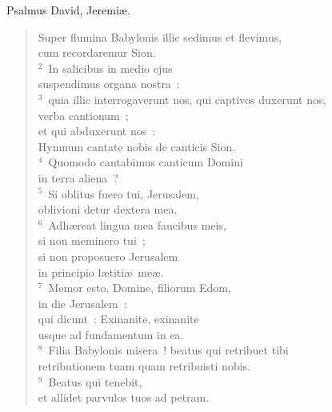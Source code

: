 \lettrine[lines=3,image=true,loversize=0.05,lraise=-0.03]{P}{}salmus David, Jeremi\ae . \begin{flushleft}\begin{verse}\vspace{6pt}Super flumina Babylonis illic sedimus et flevimus,\\ cum recordaremur Sion.\\
${}^{2}$~In salicibus in medio ejus\\ suspendimus organa nostra~:\\
${}^{3}$~quia illic interrogaverunt nos, qui captivos duxerunt nos,\\ verba cantionum~;\\ et qui abduxerunt nos~:\\ Hymnum cantate nobis de canticis Sion.\\
${}^{4}$~Quomodo cantabimus canticum Domini\\ in terra aliena~?\\
${}^{5}$~Si oblitus fuero tui, Jerusalem,\\ oblivioni detur dextera mea.\\
${}^{6}$~Adh\ae reat lingua mea faucibus meis,\\ si non meminero tui~;\\ si non proposuero Jerusalem\\ in principio l\ae titi\ae\ me\ae .\\
${}^{7}$~Memor esto, Domine, filiorum Edom,\\ in die Jerusalem~:\\ qui dicunt~: Exinanite, exinanite\\ usque ad fundamentum in ea.\\
${}^{8}$~Filia Babylonis misera~! beatus qui retribuet tibi\\ retributionem tuam quam retribuisti nobis.\\
${}^{9}$~Beatus qui tenebit,\\ et allidet parvulos tuos ad petram.\end{verse}\end{flushleft}




